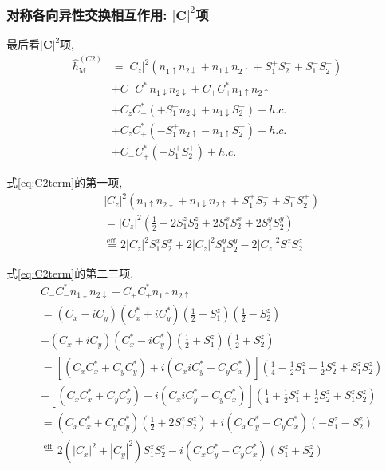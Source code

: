 \documentclass[a4paper, 12pt]{article}
\begin{document}
\subsubsection{对称各向异性交换相互作用: \(|\mathbf{C}|^2\)项}
最后看\(|\bm{C}|^2\)项, 
\begin{equation}\label{eq:C2term}
  \begin{aligned}
    \widehat{h}_{\text{M}}^{(C2)} 
    &= |C_z|^2(n_{1\uparrow}n_{2\downarrow} + n_{1\downarrow}n_{2\uparrow} + S_1^+S_2^- + S_1^-S_2^+) \\
    &+ C_-C_-^*n_{1\downarrow}n_{2\downarrow} + C_+C_+^*n_{1\uparrow}n_{2\uparrow}\\
    &+ C_zC_-^*(+S_1^-n_{2\downarrow} + n_{1\downarrow}S_2^-) + h.c.\\
    &+ C_zC_+^*(-S_1^+n_{2\uparrow} - n_{1\uparrow}S_2^+) + h.c.\\
    &+ C_-C_+^*(-S_1^+S_2^+) + h.c.
  \end{aligned}
\end{equation}

式\eqref{eq:C2term}的第一项,
\begin{equation}
  \begin{aligned}
    &|C_z|^2(n_{1\uparrow}n_{2\downarrow} + n_{1\downarrow}n_{2\uparrow} + S_1^+S_2^- + S_1^-S_2^+)\\
    &=|C_z|^2(\frac{1}{2} - 2S_1^zS_2^z + 2S_1^xS_2^x + 2S_1^yS_2^y)\\
    &\overset{\text{eff.}}{=} 2|C_z|^2S_1^xS_2^x + 2|C_z|^2S_1^yS_2^y -2|C_z|^2S_1^zS_2^z
  \end{aligned}
\end{equation}

式\eqref{eq:C2term}的第二三项,
\begin{equation}
  \begin{aligned}
    &C_-C_-^*n_{1\downarrow}n_{2\downarrow} + C_+C_+^*n_{1\uparrow}n_{2\uparrow}\\
    &= (C_x-iC_y)(C_x^*+iC_y^*)(\frac{1}{2} - S_1^z)(\frac{1}{2} - S_2^z)\\
    &+ (C_x+iC_y)(C_x^*-iC_y^*)(\frac{1}{2} + S_1^z)(\frac{1}{2} + S_2^z)\\
    &= [(C_xC_x^* + C_yC_y^*) + i(C_xiC_y^* - C_yC_x^*)](\frac{1}{4} - \frac{1}{2}S_1^z - \frac{1}{2}S_2^z + S_1^zS_2^z)\\
    &+ [(C_xC_x^* + C_yC_y^*) - i(C_xiC_y^* - C_yC_x^*)](\frac{1}{4} + \frac{1}{2}S_1^z + \frac{1}{2}S_2^z + S_1^zS_2^z)\\
    &= (C_xC_x^* + C_yC_y^*)(\frac{1}{2} + 2S_1^zS_2^z) + i(C_xC_y^* - C_yC_x^*)(-S_1^z - S_2^z)\\
    &\overset{\text{eff.}}{=}2(|C_x|^2 + |C_y|^2)S_1^zS_2^z - i(C_xC_y^* - C_yC_x^*)(S_1^z + S_2^z)
  \end{aligned}
\end{equation}
\end{document}
